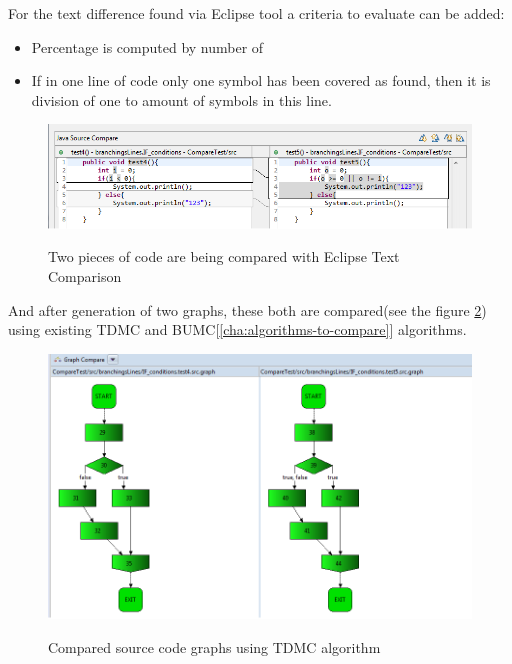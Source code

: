 \documentclass{report}
\begin{document}
For the text difference found via Eclipse tool a criteria to evaluate can be added:
\begin{itemize}
	\item Percentage is computed by number of 
	\item If in one line of code only one symbol has been covered as found, then it is division of one to amount of symbols in this line. 
\end{itemize}

\begin{figure}
  \centering
  \includegraphics[width=1.00\textwidth]{Figures/Java-flowchart-exp/example-graph.png}\\[0.1cm]
  \caption[Two pieces of code are being compared with Eclipse Text Comparison]{Two pieces of code are being compared with Eclipse Text Comparison}
  \label{fig:example-graph}
\end{figure}

And after generation of two graphs, these both are compared(see the figure \ref{fig:graphs-compared}) using existing TDMC and BUMC[\ref{cha:algorithms-to-compare}] algorithms.
\begin{figure}
  \centering
  \includegraphics[width=1.00\textwidth]{Figures/Java-flowchart-exp/graphs-compared.png}\\[0.1cm]
  \caption[Compared source code graphs using TDMC algorithm \ref{sec:topdown} ]{Compared source code graphs using TDMC algorithm}
  \label{fig:graphs-compared}
\end{figure}
\end{document}

